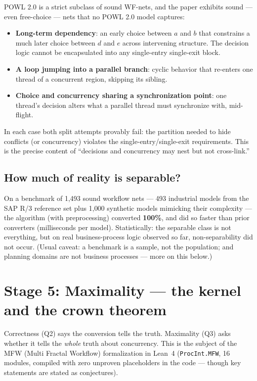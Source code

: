 \documentclass[11pt]{article}
\theoremstyle{definition}
\theoremstyle{plain}
\theoremstyle{remark}
\begin{document}
POWL 2.0 is a strict subclass of sound WF-nets, and the paper exhibits
sound --- even free-choice --- nets that no POWL 2.0 model captures:

\begin{itemize}[nosep]
  \item \textbf{Long-term dependency}: an early choice between $a$ and $b$
  that constrains a much later choice between $d$ and $e$ across intervening
  structure. The decision logic cannot be encapsulated into any single-entry
  single-exit block.
  \item \textbf{A loop jumping into a parallel branch}: cyclic behavior that
  re-enters one thread of a concurrent region, skipping its sibling.
  \item \textbf{Choice and concurrency sharing a synchronization point}:
  one thread's decision alters what a parallel thread must synchronize with,
  mid-flight.
\end{itemize}

In each case both split attempts provably fail: the partition needed to hide
conflicts (or concurrency) violates the single-entry/single-exit
requirements. This is the precise content of ``decisions and concurrency
may nest but not cross-link.''

\subsection{How much of reality is separable?}

On a benchmark of 1{,}493 sound workflow nets --- 493 industrial models from
the SAP R/3 reference set plus 1{,}000 synthetic models mimicking their
complexity --- the algorithm (with preprocessing) converted
\textbf{100\%}, and did so faster than prior converters (milliseconds per
model). Statistically: the separable class is not everything, but on real
business-process logic observed so far, non-separability did not occur.
(Usual caveat: a benchmark is a sample, not the population; and planning
domains are not business processes --- more on this below.)

\section{Stage 5: Maximality --- the kernel and the crown theorem}
\label{sec:kernel}

Correctness (Q2) says the conversion tells the truth. Maximality (Q3) asks
whether it tells the \emph{whole} truth about concurrency. This is the
subject of the MFW (Multi Fractal Workflow) formalization in Lean~4
(\texttt{ProcInt.MFW}, 16 modules, compiled with zero unproven placeholders
in the code --- though key statements are stated as conjectures).
\end{document}
